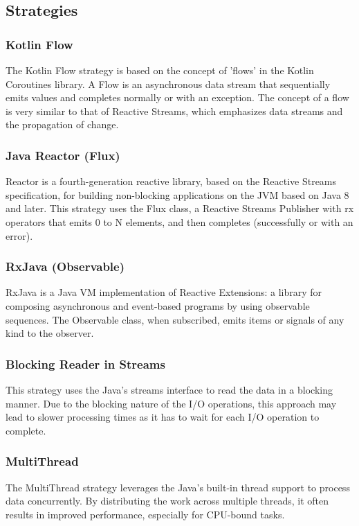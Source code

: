 \subsection{Strategies}
\label{subsec:strategies}

\subsubsection{Kotlin Flow}
\label{subsubsec:kotlin_flow}
The Kotlin Flow strategy is based on the concept of 'flows' in the Kotlin Coroutines library. A Flow is an asynchronous data stream that sequentially emits values and completes normally or with an exception. The concept of a flow is very similar to that of Reactive Streams, which emphasizes data streams and the propagation of change.

\subsubsection{Java Reactor (Flux)}
\label{subsubsec:java_reactor_flux}
Reactor is a fourth-generation reactive library, based on the Reactive Streams specification, for building non-blocking applications on the JVM based on Java 8 and later. This strategy uses the Flux class, a Reactive Streams Publisher with rx operators that emits 0 to N elements, and then completes (successfully or with an error).

\subsubsection{RxJava (Observable)}
\label{subsubsec:rxjava_observable}
RxJava is a Java VM implementation of Reactive Extensions: a library for composing asynchronous and event-based programs by using observable sequences. The Observable class, when subscribed, emits items or signals of any kind to the observer. 

\subsubsection{Blocking Reader in Streams}
\label{subsubsec:blocking_reader_streams}
This strategy uses the Java's streams interface to read the data in a blocking manner. Due to the blocking nature of the I/O operations, this approach may lead to slower processing times as it has to wait for each I/O operation to complete.

\subsubsection{MultiThread}
\label{subsubsec:multithread}
The MultiThread strategy leverages the Java's built-in thread support to process data concurrently. By distributing the work across multiple threads, it often results in improved performance, especially for CPU-bound tasks.

